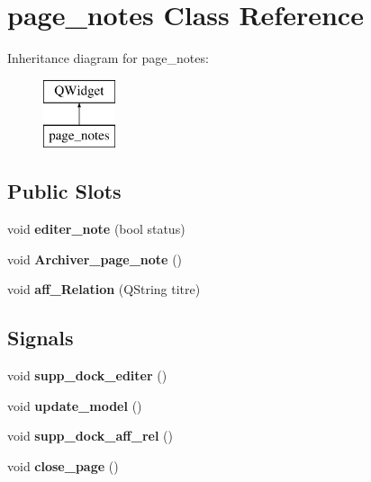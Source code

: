 \hypertarget{classpage__notes}{}\section{page\+\_\+notes Class Reference}
\label{classpage__notes}
Inheritance diagram for page\+\_\+notes\+:\begin{figure}[H]
\begin{center}
\leavevmode
\includegraphics[height=2.000000cm]{classpage__notes}
\end{center}
\end{figure}
\subsection*{Public Slots}
\begin{DoxyCompactItemize}
\item 
\mbox{\label{classpage__notes_a882eeafe3e68fd54648719624fed2345}} 
void {\bfseries editer\+\_\+note} (bool status)
\item 
\mbox{\label{classpage__notes_a143159873c27f4c3eeee183d031274fb}} 
void {\bfseries Archiver\+\_\+page\+\_\+note} ()
\item 
\mbox{\label{classpage__notes_af0db24bdc1f7bff2398f78a0c32fc51f}} 
void {\bfseries aff\+\_\+\+Relation} (Q\+String titre)
\end{DoxyCompactItemize}
\subsection*{Signals}
\begin{DoxyCompactItemize}
\item 
\mbox{\label{classpage__notes_a5b8f0db068908857d83afa630b8e4a86}} 
void {\bfseries supp\+\_\+dock\+\_\+editer} ()
\item 
\mbox{\label{classpage__notes_ab0e939533b6d2ceea5c94d7c4739e0cb}} 
void {\bfseries update\+\_\+model} ()
\item 
\mbox{\label{classpage__notes_ac0ee46fc4c828960556fff31762fcffa}} 
void {\bfseries supp\+\_\+dock\+\_\+aff\+\_\+rel} ()
\item 
\mbox{\label{classpage__notes_a53cde94ca69c6d560578b53560e72170}} 
void {\bfseries close\+\_\+page} ()
\end{DoxyCompactItemize}
